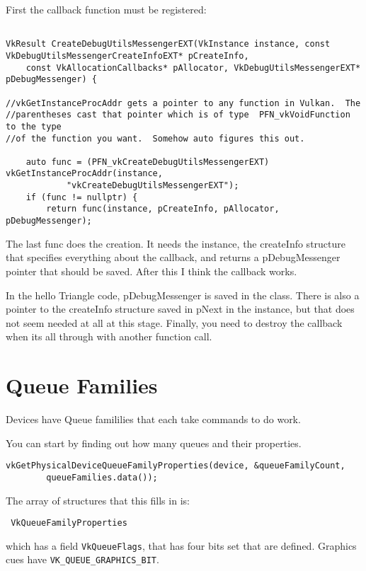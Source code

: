 \documentclass{article}
\begin{document}
First the callback function must be registered:
\begin{verbatim}

VkResult CreateDebugUtilsMessengerEXT(VkInstance instance, const VkDebugUtilsMessengerCreateInfoEXT* pCreateInfo, 
    const VkAllocationCallbacks* pAllocator, VkDebugUtilsMessengerEXT* pDebugMessenger) {
    
//vkGetInstanceProcAddr gets a pointer to any function in Vulkan.  The
//parentheses cast that pointer which is of type  PFN_vkVoidFunction to the type
//of the function you want.  Somehow auto figures this out.

	auto func = (PFN_vkCreateDebugUtilsMessengerEXT) vkGetInstanceProcAddr(instance, 
			"vkCreateDebugUtilsMessengerEXT");
    if (func != nullptr) {
        return func(instance, pCreateInfo, pAllocator, pDebugMessenger);
\end{verbatim}
The last func does the creation.  It needs the instance, the createInfo
structure that specifies everything about the callback, and returns a
pDebugMessenger pointer that should be saved.  After this I think the callback
works.  

In the hello Triangle code, pDebugMessenger is saved in the class.  There is
also a pointer to the createInfo structure saved in pNext in the instance, but
that does not seem needed at all at this stage.  Finally, you need to destroy
the callback when its all through with another function call.
\section{Queue Families}
Devices have Queue famililies that each take commands to do work. 

You can start by finding out how many queues and their properties.  
\begin{verbatim}
vkGetPhysicalDeviceQueueFamilyProperties(device, &queueFamilyCount,
		queueFamilies.data());
\end{verbatim}
The array of structures that this fills in is:
\begin{verbatim}
 VkQueueFamilyProperties
\end{verbatim}
which has a field \verb|VkQueueFlags|, that has four bits set that are defined.
Graphics cues have \verb|VK_QUEUE_GRAPHICS_BIT|.
\end{document}
